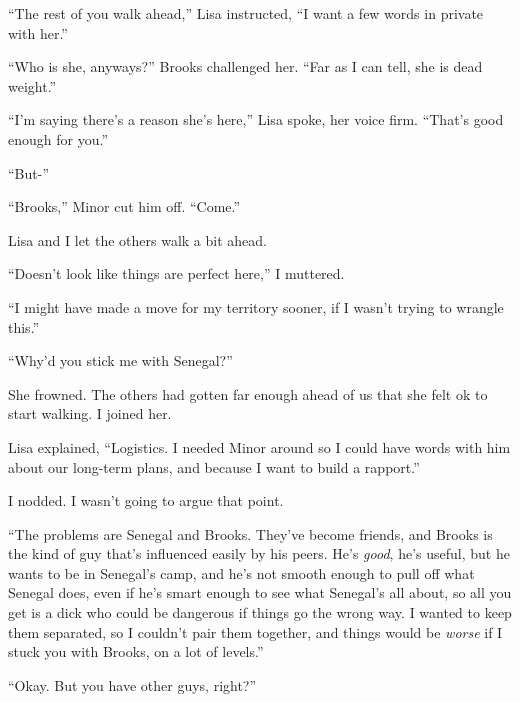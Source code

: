 ``The rest of you walk ahead,'' Lisa instructed, ``I want a few words in private with her.''



``Who is she, anyways?'' Brooks challenged her.  ``Far as I can tell, she is dead weight.''



``I'm saying there's a reason she's here,'' Lisa spoke, her voice firm.  ``That's good enough for you.''



``But-''



``Brooks,'' Minor cut him off.  ``Come.''



Lisa and I let the others walk a bit ahead.



``Doesn't look like things are perfect here,'' I muttered.



``I might have made a move for my territory sooner, if I wasn't trying to wrangle this.''



``Why'd you stick me with Senegal?''



She frowned.  The others had gotten far enough ahead of us that she felt ok to start walking.  I joined her.



Lisa explained, ``Logistics.  I needed Minor around so I could have words with him about our long-term plans, and because I want to build a rapport.''



I nodded.  I wasn't going to argue that point.



``The problems are Senegal and Brooks.  They've become friends, and Brooks is the kind of guy that's influenced easily by his peers.  He's \emph{good}, he's useful, but he wants to be in Senegal's camp, and he's not smooth enough to pull off what Senegal does, even if he's smart enough to see what Senegal's all about, so all you get is a dick who could be dangerous if things go the wrong way.  I wanted to keep them separated, so I couldn't pair them together, and things would be \emph{worse} if I stuck you with Brooks, on a lot of levels.''



``Okay.  But you have other guys, right?''



